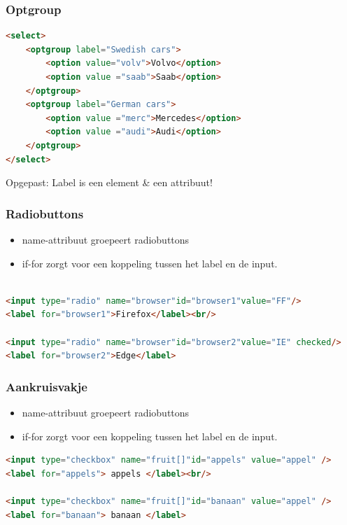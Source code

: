 \documentclass{article}
\begin{document}
\subsubsection{Optgroup}
\begin{lstlisting}[language=HTML]
<select>
    <optgroup label="Swedish cars">
        <option value="volv">Volvo</option>
        <option value ="saab">Saab</option>
    </optgroup>
    <optgroup label="German cars">
        <option value ="merc">Mercedes</option>
        <option value ="audi">Audi</option>
    </optgroup>
</select>
\end{lstlisting}
Opgepast: Label is een element \& een attribuut!

\subsubsection{Radiobuttons}
\begin{itemize}
    \item name-attribuut groepeert radiobuttons
    \item if-for zorgt voor een koppeling tussen het label en de input. 
\end{itemize}
\begin{lstlisting}[language=HTML]

<input type="radio" name="browser"id="browser1"value="FF"/>
<label for="browser1">Firefox</label><br/>

<input type="radio" name="browser"id="browser2"value="IE" checked/> 
<label for="browser2">Edge</label>

\end{lstlisting}


\subsubsection{Aankruisvakje}
\begin{itemize}
    \item name-attribuut groepeert radiobuttons
    \item if-for zorgt voor een koppeling tussen het label en de input.
\end{itemize}

\begin{lstlisting}[language=HTML]
<input type="checkbox" name="fruit[]"id="appels" value="appel" />
<label for="appels"> appels </label><br/>

<input type="checkbox" name="fruit[]"id="banaan" value="appel" />
<label for="banaan"> banaan </label>

\end{lstlisting}
\end{document}

